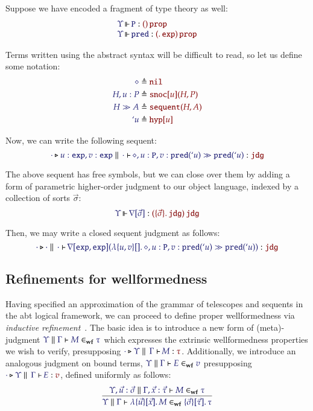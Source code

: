 \documentclass[11pt]{article}
\theoremstyle{definition}
\theoremstyle{remark}
\numberwithin{equation}{section}
\newcommand\SortExp{\mathtt{exp}}
\newcommand\IsWf[4]{%
  \IMode{#1}\parallel%
  \IMode{#2}\vdash%
  \IMode{#3}\in_{\mathbf{wf}}\IMode{#4}%
}
\begin{document}
Suppose we have encoded a fragment of type theory as well:
\[
  \begin{array}{l}
    \IsOperator{\Upsilon}{\mathtt{P}}{
      \MkArity{}{\SortProp}
    }
\\
    \IsOperator{\Upsilon}{\mathtt{pred}}{
      \MkArity{
        \MkValence{}{}{\SortExp}
      }{\SortProp}
    }
\\
  \end{array}
\]

Terms written using the abstract syntax will be difficult to read, so let us
define some notation:
\begin{align*}
  \IMode{\diamond}
&
  \triangleq \OMode{\OpNil}
\\
  \IMode{H, u:P}
&
  \triangleq \OMode{
    \App{\OpSnoc{u}}{H, P}
  }
\\
  \IMode{H\gg A}
&
  \triangleq \OMode{
    \App{\OpSequent}{
      H, A
    }
  }
\\
  \IMode{`u}
&
  \triangleq \OMode{\OpHyp{u}}
\end{align*}

Now, we can write the following sequent:
\[
  \IsAbt{\cdot}{
    u:\SortExp,
    v:\SortExp
  }{\cdot}{
    \diamond,u:\mathtt{P},v:\App{\mathtt{pred}}{`u}
    \gg
    \App{\mathtt{pred}}{`u}
  }{\SortJdg}
\]

\newcommand\OpNabla[1]{\nabla[#1]}

The above sequent has free symbols, but we can close over them by adding a form
of parametric higher-order judgment to our object language, indexed by a
collection of sorts $\vec{\sigma}$:
\[
  \IsOperator{\Upsilon}{\OpNabla{\vec{\sigma}}}{
    \MkArity{
      \MkValence{\vec{\sigma}}{}{\SortJdg}
    }{\SortJdg}
  }
\]

Then, we may write a closed sequent judgment as follows:
\[
  \IsAbt{\cdot}{\cdot}{\cdot}{
    \App{\OpNabla{\SortExp,\SortExp}}{
      \MkBTm{u,v}{}{
        \diamond,u:\mathtt{P},v:\App{\mathtt{pred}}{`u}
        \gg
        \App{\mathtt{pred}}{`u}
      }
    }
  }{\SortJdg}
\]

\subsection{Refinements for wellformedness}

Having specified an approximation of the grammar of telescopes and sequents in
the abt logical framework, we can proceed to define proper wellformedness via
\emph{inductive refinement}~\cite{harper:2016}. The basic idea is to introduce a
new form of (meta)-judgment $\IsWf{\Upsilon}{\Gamma}{M}{\tau}$ which
expresses the extrinsic wellformedness properties we wish to verify,
presupposing $\IsAbt{\cdot}{\Upsilon}{\Gamma}{M}{\tau}$. Additionally, we
introduce an analogous judgment on bound terms,
$\IsWf{\Upsilon}{\Gamma}{E}{v}$ presupposing
$\IsAbt{\cdot}{\Upsilon}{\Gamma}{E}{v}$, defined uniformly as follows:
\[
  \infer{
    \IsWf{\Upsilon}{\Gamma}{
      \MkBTm{\vec{u}}{\vec{x}}{M}
    }{
      \MkValence{\vec{\sigma}}{\vec{\tau}}{\tau}
    }
  }{
    \IsWf{\Upsilon,\vec{u}:\vec{\sigma}}{\Gamma,\vec{x}:\vec{\tau}}{M}{\tau}
  }
\]
\end{document}
